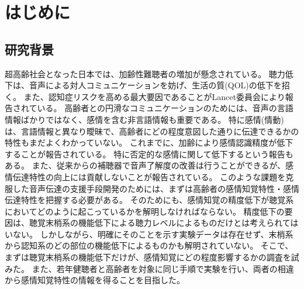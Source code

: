 
\chapter{はじめに}
\label{chap:Intro}


\section{研究背景}
\label{sec:研究背景}
超高齢社会となった日本では、加齢性難聴者の増加が懸念されている。
聴力低下は、音声による対人コミュニケーションを妨げ、生活の質(QOL)の低下を招く。
また、認知症リスクを高める最大要因であることがLancet委員会により報告されている\cite{livingston2024dementia-Short}。
高齢者との円滑なコミュニケーションのためには、音声の言語情報ばかりではなく、感情を含む非言語情報も重要である。
特に感情(情動)は、言語情報と異なり曖昧で、高齢者にどの程度意図した通りに伝達できるかの特性もまだよくわかっていない。
これまでに、加齢により感情認識精度が低下することが報告されている\cite{paulmann2008aging,ben2019age,amorim2021changes}。
特に否定的な感情に関して低下するという報告もある\cite{mill2009age}。
また、従来からの補聴器で音声了解度の改善は行うことができるが、感情伝達特性の向上には貢献しないことが報告されている\cite{goy2018hearing}。
このような課題を克服した音声伝達の支援手段開発のためには、まずは高齢者の感情知覚特性・感情伝達特性を把握する必要がある。
そのためにも、感情知覚の精度低下が聴覚系においてどのように起こっているかを解明しなければならない。
精度低下の要因は、聴覚末梢系の機能低下による聴力レベルによるものだけとは考えられてはいない。
しかしながら、明確にそのことを示す実験データは存在せず、末梢系から認知系のどの部位の機能低下によるものかも解明されていない。
そこで、まずは聴覚末梢系の機能低下だけが、感情知覚にどの程度影響するかの調査を試みた。
また、若年健聴者と高齢者を対象に同じ手順で実験を行い、両者の相違から感情知覚特性の情報を得ることを目指した。

